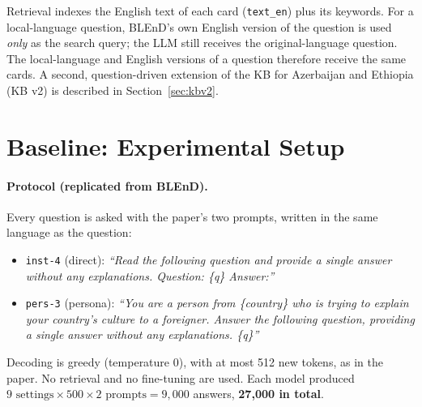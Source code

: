 \documentclass[11pt]{article}
\begin{document}
\noindent Retrieval indexes the English text of each card (\texttt{text\_en}) plus its keywords.
For a local-language question, BLEnD's own English version of the question is used \emph{only} as the
search query; the LLM still receives the original-language question. The local-language and English
versions of a question therefore receive the same cards. A second, question-driven extension of the
KB for Azerbaijan and Ethiopia (KB v2) is described in Section~\ref{sec:kbv2}.

\section{Baseline: Experimental Setup}
\paragraph{Protocol (replicated from BLEnD).} Every question is asked with the paper's two prompts,
written in the same language as the question:
\begin{itemize}
\item \texttt{inst-4} (direct): \emph{``Read the following question and provide a single answer
without any explanations. Question: \{q\} Answer:''}
\item \texttt{pers-3} (persona): \emph{``You are a person from \{country\} who is trying to explain
your country's culture to a foreigner. Answer the following question, providing a single answer
without any explanations. \{q\}''}
\end{itemize}
Decoding is greedy (temperature 0), with at most 512 new tokens, as in the paper. No retrieval and
no fine-tuning are used. Each model produced $9 \text{ settings} \times 500 \times 2 \text{ prompts}
= 9{,}000$ answers, \textbf{27{,}000 in total}.
\end{document}

